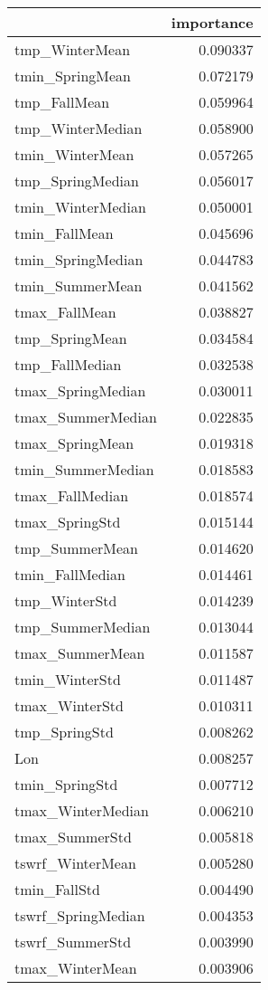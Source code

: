 \begin{tabular}{lr}
\toprule
 & importance \\
\midrule
tmp_WinterMean & 0.090337 \\
tmin_SpringMean & 0.072179 \\
tmp_FallMean & 0.059964 \\
tmp_WinterMedian & 0.058900 \\
tmin_WinterMean & 0.057265 \\
tmp_SpringMedian & 0.056017 \\
tmin_WinterMedian & 0.050001 \\
tmin_FallMean & 0.045696 \\
tmin_SpringMedian & 0.044783 \\
tmin_SummerMean & 0.041562 \\
tmax_FallMean & 0.038827 \\
tmp_SpringMean & 0.034584 \\
tmp_FallMedian & 0.032538 \\
tmax_SpringMedian & 0.030011 \\
tmax_SummerMedian & 0.022835 \\
tmax_SpringMean & 0.019318 \\
tmin_SummerMedian & 0.018583 \\
tmax_FallMedian & 0.018574 \\
tmax_SpringStd & 0.015144 \\
tmp_SummerMean & 0.014620 \\
tmin_FallMedian & 0.014461 \\
tmp_WinterStd & 0.014239 \\
tmp_SummerMedian & 0.013044 \\
tmax_SummerMean & 0.011587 \\
tmin_WinterStd & 0.011487 \\
tmax_WinterStd & 0.010311 \\
tmp_SpringStd & 0.008262 \\
Lon & 0.008257 \\
tmin_SpringStd & 0.007712 \\
tmax_WinterMedian & 0.006210 \\
tmax_SummerStd & 0.005818 \\
tswrf_WinterMean & 0.005280 \\
tmin_FallStd & 0.004490 \\
tswrf_SpringMedian & 0.004353 \\
tswrf_SummerStd & 0.003990 \\
tmax_WinterMean & 0.003906 \\

\end{tabular}
